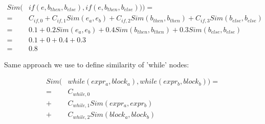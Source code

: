 \begin{align*}
	Sim(&if(e, b_{then}, b_{else}), if(e, b_{then}, b_{else}))) = \\
	=& C_{if,0} + C_{if,1} Sim(e_a, e_b) + C_{if,2} Sim(b_{then}, b_{then}) + C_{if,3} Sim(b_{else}, b_{else}) \\
	=& 0.1 + 0.2 Sim(e_a, e_b) +	0.4 Sim(b_{then}, b_{then}) +	0.3 Sim(b_{else}, b_{else}) \\
	=& 0.1 + 0 + 0.4 + 0.3 \\
	=& 0.8
\end{align*}

Same approach we use to define similarity of 'while' nodes:

\begin{align*}
	Sim(&while(expr_a, block_a), while(expr_b, block_b)) = \\
	=&C_{while,0} \\
	+&C_{while,1} Sim(expr_a, expr_b) \\
	+&C_{while,2} Sim(block_a, block_b)
\end{align*}




